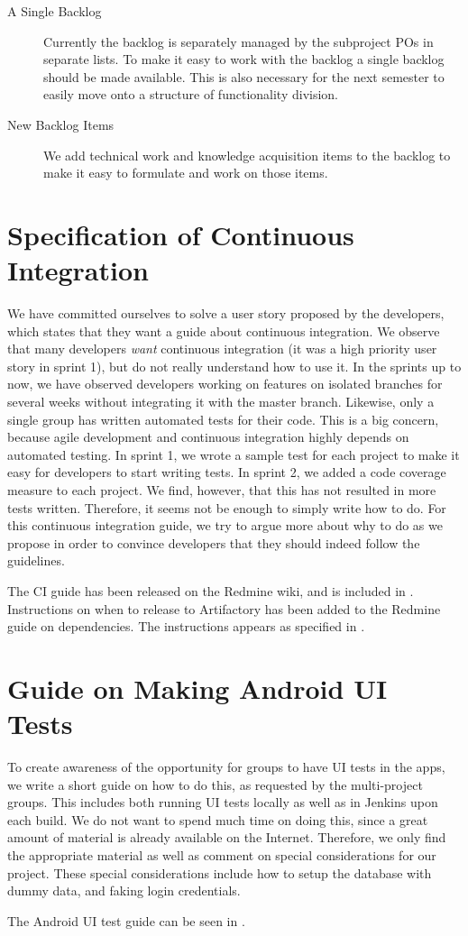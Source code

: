 \begin{description}
  \item[A Single Backlog] Currently the backlog is separately managed by the subproject POs in separate lists. To make it easy to work with the backlog a single backlog should be made available. This is also necessary for the next semester to easily move onto a structure of functionality division.
  \item[New Backlog Items] We add technical work and knowledge acquisition items to the backlog to make it easy to formulate and work on those items.
\end{description}

\section{Specification of Continuous Integration}
We have committed ourselves to solve a user story proposed by the developers, which states that they want a guide about continuous integration. We observe that many developers \emph{want} continuous integration (it was a high priority user story in sprint 1), but do not really understand how to use it. In the sprints up to now, we have observed developers working on features on isolated branches for several weeks without integrating it with the master branch. Likewise, only a single group has written automated tests for their code. This is a big concern, because agile development and continuous integration highly depends on automated testing. In sprint 1, we wrote a sample test for each project to make it easy for developers to start writing tests. In sprint 2, we added a code coverage measure to each project. We find, however, that this has not resulted in more tests written. Therefore, it seems not be enough to simply write how to do. For this continuous integration guide, we try to argue more about why to do as we propose in order to convince developers that they should indeed follow the guidelines.

The CI guide has been released on the Redmine wiki, and is included in . Instructions on when to release to Artifactory has been added to the Redmine guide on dependencies. The instructions appears as specified in .

\section{Guide on Making Android UI Tests}
To create awareness of the opportunity for groups to have UI tests in the apps, we write a short guide on how to do this, as requested by the multi-project groups. This includes both running UI tests locally as well as in Jenkins upon each build. We do not want to spend much time on doing this, since a great amount of material is already available on the Internet. Therefore, we only find the appropriate material as well as comment on special considerations for our project. These special considerations include how to setup the database with dummy data, and faking login credentials.

The Android UI test guide can be seen in .